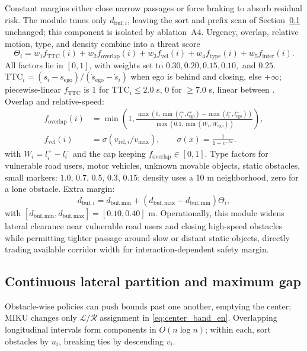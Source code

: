 Constant margins either close narrow passages or force braking to absorb residual risk. The module tunes only $d_{\mathrm{buf},i}$, leaving the sort and prefix scan of Section~\ref{sec:method_band_en} unchanged; this component is isolated by ablation~A4. Urgency, overlap, relative motion, type, and density combine into a threat score
\begin{equation}
 \Theta_i=w_1f_{\mathrm{TTC}}(i)+w_2f_{\mathrm{overlap}}(i)+w_3f_{\mathrm{vel}}(i)+w_4f_{\mathrm{type}}(i)+w_5f_{\mathrm{inter}}(i).
 \label{eq:threat_score_en}
\end{equation}
All factors lie in $[0,1]$, with weights set to $0.30, 0.20, 0.15, 0.10,$ and $0.25$. $\mathrm{TTC}_i=(s_i-s_{\mathrm{ego}})/(\dot{s}_{\mathrm{ego}}-\dot{s}_i)$ when ego is behind and closing, else $+\infty$; piecewise-linear $f_{\mathrm{TTC}}$ is $1$ for $\mathrm{TTC}_i\leq2.0$ s, $0$ for $\geq7.0$ s, linear between \citep{minderhoud2001extended}. Overlap and relative-speed:
\begin{align}
 f_{\mathrm{overlap}}(i)&=\min\!\left(1,\frac{\max(0,\min(l_i^+,l_{\mathrm{ego}}^+)-\max(l_i^-,l_{\mathrm{ego}}^-))}{\max(0.1,\min(W_i,W_{\mathrm{ego}}))}\right),\\
 f_{\mathrm{vel}}(i)&=\sigma(v_{\mathrm{rel},i}/v_{\max}),\qquad \sigma(x)=\frac{1}{1+e^{-5x}}.
\end{align}
with $W_i=l_i^+-l_i^-$ and the cap keeping $f_{\mathrm{overlap}}\!\in\![0,1]$. Type factors for vulnerable road users, motor vehicles, unknown movable objects, static obstacles, small markers: $1.0$, $0.7$, $0.5$, $0.3$, $0.15$; density uses a 10 m neighborhood, zero for a lone obstacle. Extra margin:
\begin{equation}
 d_{\mathrm{buf},i}=d_{\mathrm{buf,min}}+(d_{\mathrm{buf,max}}-d_{\mathrm{buf,min}})\Theta_i,
 \label{eq:dynamic_delta_en}
\end{equation}
with $[d_{\mathrm{buf,min}},d_{\mathrm{buf,max}}]=[0.10,0.40]$ m. Operationally, this module widens lateral clearance near vulnerable road users and closing high-speed obstacles while permitting tighter passage around slow or distant static objects, directly trading available corridor width for interaction-dependent safety margin.

\subsection{Continuous lateral partition and maximum gap}
\label{sec:method_band_en}

Obstacle-wise policies can push bounds past one another, emptying the center; MIKU changes only $\mathcal{L}/\mathcal{R}$ assignment in \eqref{eq:center_band_en}. Overlapping longitudinal intervals form components in $O(n\log n)$; within each, sort obstacles by $u_i$, breaking ties by descending $v_i$.

